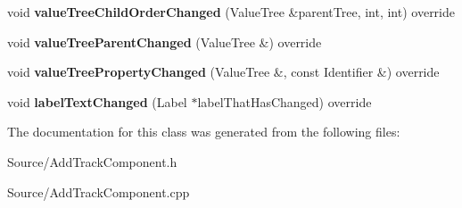 \begin{DoxyCompactItemize}
\mbox{\label{class_add_track_component_a2560eb3534add103c40b4f51896541c2}} 
void {\bfseries value\+Tree\+Child\+Order\+Changed} (Value\+Tree \&parent\+Tree, int, int) override
\item 
\mbox{\label{class_add_track_component_afc24a17c0447ebfbb2d6af49418cbc81}} 
void {\bfseries value\+Tree\+Parent\+Changed} (Value\+Tree \&) override
\item 
\mbox{\label{class_add_track_component_aa689966f2c4b2cf34b1560b6584c3618}} 
void {\bfseries value\+Tree\+Property\+Changed} (Value\+Tree \&, const Identifier \&) override
\item 
\mbox{\label{class_add_track_component_ab24e65cd1de37d4e572d7ac4ff7cae63}} 
void {\bfseries label\+Text\+Changed} (Label $\ast$label\+That\+Has\+Changed) override
\end{DoxyCompactItemize}


The documentation for this class was generated from the following files\+:\begin{DoxyCompactItemize}
\item 
Source/Add\+Track\+Component.\+h\item 
Source/Add\+Track\+Component.\+cpp\end{DoxyCompactItemize}
